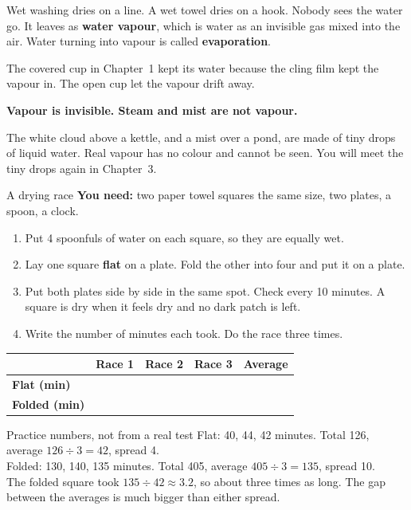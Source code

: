 \label{ch2}

Wet washing dries on a line. A wet towel dries on a hook. Nobody sees the water go. It leaves as \textbf{water vapour}, which is water as an invisible gas mixed into the air. Water turning into vapour is called \textbf{evaporation}.

The covered cup in Chapter~1 kept its water because the cling film kept the vapour in. The open cup let the vapour drift away.

\begin{tcolorbox}[colback=sun!14,colframe=sun!85!black,boxrule=1.2pt,arc=2mm,left=6pt,right=6pt,top=4pt,bottom=4pt,before skip=8pt,after skip=8pt]
\sans\bfseries\color{ink} Vapour is invisible. Steam and mist are not vapour.\par
\normalfont\sffamily\small The white cloud above a kettle, and a mist over a pond, are made of tiny drops of liquid water. Real vapour has no colour and cannot be seen. You will meet the tiny drops again in Chapter~3.
\end{tcolorbox}

\begin{tryit}{A drying race}
\textbf{You need:} two paper towel squares the same size, two plates, a spoon, a clock.
\begin{enumerate}[leftmargin=1.6em]
\item Put 4 spoonfuls of water on each square, so they are equally wet.
\item Lay one square \textbf{flat} on a plate. Fold the other into four and put it on a plate.
\item Put both plates side by side in the same spot. Check every 10 minutes. A square is dry when it feels dry and no dark patch is left.
\item Write the number of minutes each took. Do the race three times.
\end{enumerate}
\par\medskip
\renewcommand{\arraystretch}{1.6}
\begin{tabular}{|l|c|c|c|c|}
\hline
 & \textbf{Race 1} & \textbf{Race 2} & \textbf{Race 3} & \textbf{Average}\\ \hline
\textbf{Flat (min)} & & & & \\ \hline
\textbf{Folded (min)} & & & & \\ \hline
\end{tabular}
\end{tryit}

\begin{worked}{Practice numbers, not from a real test}
Flat: 40, 44, 42 minutes. Total 126, average $126\div3=42$, spread 4.\\
Folded: 130, 140, 135 minutes. Total 405, average $405\div3=135$, spread 10.\\
The folded square took $135\div42\approx3.2$, so about three times as long. The gap between the averages is much bigger than either spread.
\end{worked}

